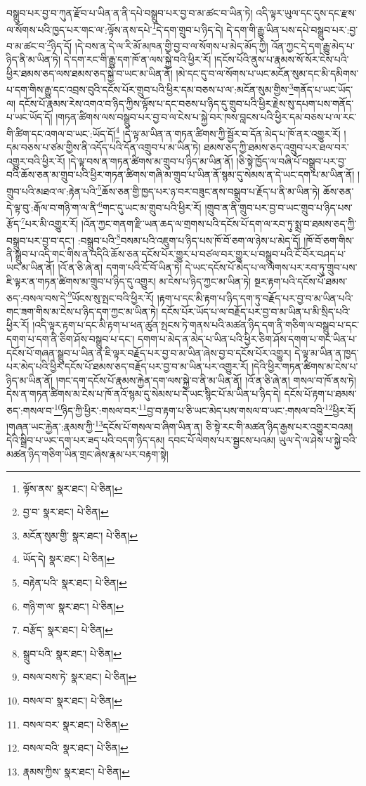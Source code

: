 བསྒྲུབ་པར་བྱ་བ་ཀུན་རྫོབ་པ་ཡིན་ན་ནི་དཔེ་བསྒྲུབ་པར་བྱ་བ་མ་ཚང་བ་ཡིན་ཏེ། འདི་ལྟར་ཡུལ་དང་དུས་དང་རྫས་ལ་སོགས་པའི་ཁྱད་པར་གང་ལ་:ལྟོས་ནས་དཔེ་\footnote{ལྟོས་ནས་  སྣར་ཐང་།  པེ་ཅིན། }དེ་དག་གྲུབ་པ་ཉིད་དེ། དེ་དག་གི་རྒྱུ་ཡིན་པས་དཔེ་བསྒྲུབ་པར་:བྱ་བ་མ་ཚང་བ་\footnote{བྱ་བ་  སྣར་ཐང་།  པེ་ཅིན། }ཉིད་དོ། །དེ་བས་ན་དེ་ལ་རི་མོ་མཁན་གྱི་བྱ་བ་ལ་སོགས་པ་མེད་མོད་ཀྱི། འོན་ཀྱང་དེ་དག་རྒྱུ་མེད་པ་ཉིད་ནི་མ་ཡིན་ཏེ། དེ་དག་རང་གི་རྒྱུ་དག་ཁོ་ན་ལས་སྐྱེ་བའི་ཕྱིར་རོ། །དངོས་པོའི་ནུས་པ་རྣམས་སོ་སོར་ངེས་པའི་ཕྱིར་ཐམས་ཅད་ལས་ཐམས་ཅད་སྐྱེ་བ་ཡང་མ་ཡིན་ནོ། །མེ་དང་དུ་བ་ལ་སོགས་པ་ཡང་མངོན་སུམ་དང་མི་དམིགས་པ་དག་གིས་རྒྱུ་དང་འབྲས་བུའི་དངོས་པོར་གྲུབ་པའི་ཕྱིར་དམ་བཅས་པ་ལ་:མངོན་སུམ་གྱིས་\footnote{མངོན་སུམ་གྱི་  སྣར་ཐང་།  པེ་ཅིན། }གནོད་པ་ཡང་ཡོད་ལ། དངོས་པོ་རྣམས་རེས་འགའ་བ་ཉིད་ཀྱིས་ལྟོས་པ་དང་བཅས་པ་ཉིད་དུ་གྲུབ་པའི་ཕྱིར་རྗེས་སུ་དཔག་པས་གནོད་པ་ཡང་ཡོད་དོ། །གཏན་ཚིགས་ལས་བསྒྲུབ་པར་བྱ་བ་ལ་ངེས་པ་སྐྱེ་བར་ཁས་བླངས་པའི་ཕྱིར་དམ་བཅས་པ་ལ་རང་གི་ཚིག་དང་འགལ་བ་ཡང་:ཡོད་དོ།\footnote{ཡོད་དེ།  སྣར་ཐང་།  པེ་ཅིན། } །དེ་ལྟ་མ་ཡིན་ན་གཏན་ཚིགས་ཀྱི་སྦྱོར་བ་དོན་མེད་པ་ཁོ་ནར་འགྱུར་རོ། །དམ་བཅས་པ་ཙམ་གྱིས་ནི་འདོད་པའི་དོན་འགྲུབ་པ་མ་ཡིན་ཏེ། ཐམས་ཅད་ཀྱི་ཐམས་ཅད་འགྲུབ་པར་ཐལ་བར་འགྱུར་བའི་ཕྱིར་རོ། །དེ་ལྟ་བས་ན་གཏན་ཚིགས་མ་གྲུབ་པ་ཉིད་མ་ཡིན་ནོ། །ཅི་སྟེ་ཁྱོད་ལ་བཞི་པོ་བསྒྲུབ་པར་བྱ་བའི་ཆོས་ཅན་མ་གྲུབ་པའི་ཕྱིར་གཏན་ཚིགས་གཞི་མ་གྲུབ་པ་ཡིན་ནོ་སྙམ་དུ་སེམས་ན་དེ་ཡང་དག་པ་མ་ཡིན་ནོ། །གྲུབ་པའི་མཐའ་ལ་:རྟེན་པའི་\footnote{བརྟེན་པའི་  སྣར་ཐང་།  པེ་ཅིན། }ཆོས་ཅན་གྱི་ཁྱད་པར་ཉ་བར་བཟུང་ནས་བསྒྲུབ་པ་རྗོད་པ་ནི་མ་ཡིན་ཏེ། ཆོས་ཅན་དེ་ལྟ་བུ་:རྒོལ་བ་གཉི་ག་ལ་ནི་\footnote{གཉི་ག་ལ་  སྣར་ཐང་།  པེ་ཅིན། }གང་དུ་ཡང་མ་གྲུབ་པའི་ཕྱིར་རོ། །གྲུབ་ན་ནི་གྲུབ་པར་བྱ་བ་ཡང་གྲུབ་པ་ཉིད་པས་རྩོད་\footnote{བརྩོད་  སྣར་ཐང་།  པེ་ཅིན། }པར་མི་འགྱུར་རོ། །འོན་ཀྱང་གནག་རྫི་ཡན་ཆད་ལ་གྲགས་པའི་དངོས་པོ་དག་ལ་རབ་ཏུ་སྨྲ་བ་ཐམས་ཅད་ཀྱི་བསྒྲུབ་པར་བྱ་བ་དང་། :བསྒྲུབ་པའི་\footnote{སྒྲུབ་པའི་  སྣར་ཐང་།  པེ་ཅིན། }བསམ་པའི་འཇུག་པ་ཉིད་པས་ཁོ་བོ་ཅག་ལ་ཉེས་པ་མེད་དོ། །ཁོ་བོ་ཅག་གིས་ནི་སྒྲུབ་པ་འདི་གང་གིས་ན་འདིའི་ཆོས་ཅན་དངོས་པོར་གྱུར་པ་བཙལ་བར་གྱུར་པ་བསྒྲུབ་པའི་ངོ་བོར་བཤད་པ་ཡང་མ་ཡིན་ནོ། །འོ་ན་ཅི་ཞེ་ན། དགག་པའི་ངོ་བོ་ཡིན་ཏེ། དེ་ཡང་དངོས་པོ་མེད་པ་ལ་ལེགས་པར་རབ་ཏུ་གྲུབ་པས་ཇི་ལྟར་ན་གཏན་ཚིགས་མ་གྲུབ་པ་ཉིད་དུ་འགྱུར། མ་ངེས་པ་ཉིད་ཀྱང་མ་ཡིན་ཏེ། སྔར་རྟག་པའི་དངོས་པོ་ཐམས་ཅད་:བསལ་བས་དེ་\footnote{བསལ་བས་ཏེ་  སྣར་ཐང་།  པེ་ཅིན། }ཡོངས་སུ་སྤང་བའི་ཕྱིར་རོ། །རྟག་པ་དང་མི་རྟག་པ་ཉིད་དག་ཏུ་བརྗོད་པར་བྱ་བ་མ་ཡིན་པའི་གང་ཟག་གིས་མ་ངེས་པ་ཉིད་དག་ཀྱང་མ་ཡིན་ཏེ། དངོས་པོར་ཡོད་པ་ལ་བརྗོད་པར་བྱ་བ་མ་ཡིན་པ་མི་སྲིད་པའི་ཕྱིར་རོ། །འདི་ལྟར་རྟག་པ་དང་མི་རྟག་པ་ཕན་ཚུན་སྤངས་ཏེ་གནས་པའི་མཚན་ཉིད་དག་ནི་གཅིག་ལ་བསྒྲུབ་པ་དང་དགག་པ་དག་ནི་ཅིག་ཤོས་བསྒྲུབ་པ་དང་། དགག་པ་མེད་ན་མེད་པ་ཡིན་པའི་ཕྱིར་ཅིག་ཤོས་དགག་པ་གང་ཡིན་པ་དངོས་པོ་གཞན་སྒྲུབ་པ་ཡིན་ན་ཇི་ལྟར་བརྗོད་པར་བྱ་བ་མ་ཡིན་ཞེས་བྱ་བ་དངོས་པོར་འགྱུར། དེ་ལྟ་མ་ཡིན་ན་ཁྱད་པར་མེད་པའི་ཕྱིར་དངོས་པོ་ཐམས་ཅད་བརྗོད་པར་བྱ་བ་མ་ཡིན་པར་འགྱུར་རོ། །དེའི་ཕྱིར་གཏན་ཚིགས་མ་ངེས་པ་ཉིད་མ་ཡིན་ནོ། །གང་དག་དངོས་པོ་རྣམས་རྐྱེན་དག་ལས་སྐྱེ་བ་ནི་མ་ཡིན་ནོ། །འོ་ན་ཅི་ཞེ་ན། གསལ་བ་ཁོ་ནས་ཏེ། དེས་ན་གཏན་ཚིགས་མ་ངེས་པ་ཁོ་ནའོ་སྙམ་དུ་སེམས་པ་དེ་ཡང་སྙིང་པོ་མ་ཡིན་པ་ཉིད་དེ། དངོས་པོ་རྟག་པ་ཐམས་ཅད་:གསལ་བ་\footnote{བསལ་བ་  སྣར་ཐང་།  པེ་ཅིན། }ཉིད་ཀྱི་ཕྱིར་:གསལ་བར་\footnote{བསལ་བར་  སྣར་ཐང་།  པེ་ཅིན། }བྱ་བ་རྟག་པ་ཅི་ཡང་མེད་པས་གསལ་བ་ཡང་:གསལ་བའི་\footnote{བསལ་བའི་  སྣར་ཐང་།  པེ་ཅིན། }ཕྱིར་རོ། །གཞན་ཡང་རྐྱེན་:རྣམས་ཀྱི་\footnote{རྣམས་ཀྱིས་  སྣར་ཐང་།  པེ་ཅིན། }དངོས་པོ་གསལ་བ་ཞིག་ཡིན་ན། ཅི་སྟེ་རང་གི་མཚན་ཉིད་རྒྱས་པར་འགྱུར་བའམ། དེའི་སྒྲིབ་པ་ཡང་དག་པར་ཟད་པའི་བདག་ཉིད་དམ། དབང་པོ་ལེགས་པར་སྦྱངས་པའམ། ཡུལ་དེ་ལ་ཤེས་པ་སྐྱེ་བའི་མཚན་ཉིད་གཅིག་ཡིན་གྲང་ཞེས་རྣམ་པར་བརྟག་སྟེ། 